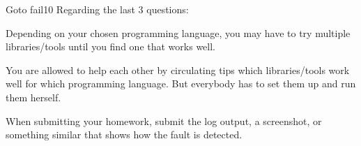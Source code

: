 \documentclass[a4paper]{article}
\begin{document}
\begin{problem}{Goto fail}{10}
Regarding the last 3 questions:
\begin{compactitem}
 \item Depending on your chosen programming language, you may have to try multiple libraries/tools until you find one that works well.
 \item You are allowed to help each other by circulating tips which libraries/tools work well for which programming language.
 But everybody has to set them up and run them herself.
 \item When submitting your homework, submit the log output, a screenshot, or something similar that shows how the fault is detected.
\end{compactitem}
\end{problem}
\end{document}
